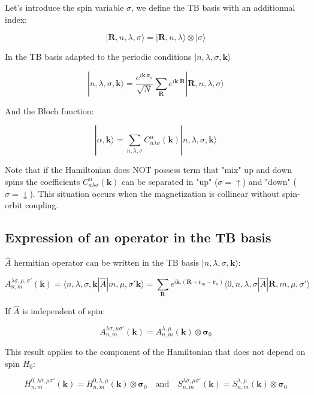 \documentclass{article}
\newcommand{\bra}[1]{\langle #1|}
\newcommand{\ket}[1]{|#1\rangle}
\newcommand{\op}[1]{\hat{#1}}
\begin{document}
\noindent
Let's introduce the spin variable $\sigma$, we define the TB basis with an additionnal index:

\[ \ket{\mathbf{R},n,\lambda,\sigma}= \ket{\mathbf{R},n,\lambda \rangle \otimes |\sigma }\]

\noindent In the TB basis adapted to the periodic conditions $\ket{n,\lambda ,\sigma, \mathbf{k}}$

\[ \displaystyle \ket{n,\lambda,\sigma, \mathbf{k} }=\frac{e^{i 
\mathbf{k}.\bm{r}_n}}{\sqrt{N}}
\sum_{\mathbf{R}} e^{i \mathbf{k}.\mathbf{R}} \ket{\mathbf{R},n,\lambda,\sigma} \]

\noindent
And the Bloch function:

\[ \displaystyle \ket{\alpha , \mathbf{k}}=
\sum_{n,\lambda, \sigma} C_{n \lambda
\sigma}^{\alpha}(\mathbf{k})\ket{n,\lambda, \sigma, \mathbf{k} }
\]


\noindent
Note that if the Hamiltonian does NOT possess term that "mix" up and down spins the coefficients $C_{a \lambda \sigma}^{\alpha}(\mathbf{k})$ can be separated in "up" ($\sigma=\uparrow $) and "down" ($\sigma=\downarrow $). This situation occurs when the magnetization is collinear without spin-orbit coupling.


\subsection{Expression of an operator in the TB basis}


\noindent $\op{A}$ hermitian operator
can be written in the TB basis $\ket{n,\lambda,\sigma,\mathbf{k}}$:

\[\displaystyle A_{n,m}^{\lambda \sigma,\mu, \sigma'}(\mathbf{k})=
\bra{n,\lambda,\sigma,\mathbf{k}}\op{A}\ket{m,\mu,
\sigma'\mathbf{k}}= \sum_{\mathbf{R}}
e^{i\mathbf{k}.(\mathbf{R}+\mathbf{r}_{m}-\mathbf{r}_n)} \bra{0,n,\lambda,\sigma }
 \op{A} \ket{\mathbf{R},m,\mu,\sigma'} \]

\noindent
If $\op{A}$ is independent of spin:

\[ \displaystyle A_{n,m}^{\lambda \sigma,\mu 
\sigma'}(\mathbf{k})= A_{n,m}^{\lambda,\mu}(\mathbf{k}) \otimes \bm{\sigma}_0 \]

\noindent
This result applies to the component of the Hamiltonian that does not depend on spin $H_0$:

\[ H_{n,m}^{0,\lambda \sigma, \mu \sigma'} (\mathbf{k}) 
=H_{n,m}^{0, \lambda, \mu} (\mathbf{k}) \otimes \bm{\sigma}_0
\quad \text{and} \quad
S_{n,m}^{\lambda \sigma, \mu \sigma'} (\mathbf{k}) 
=S_{n,m}^{\lambda, \mu} (\mathbf{k}) \otimes \bm{\sigma}_0
\]
\end{document}
